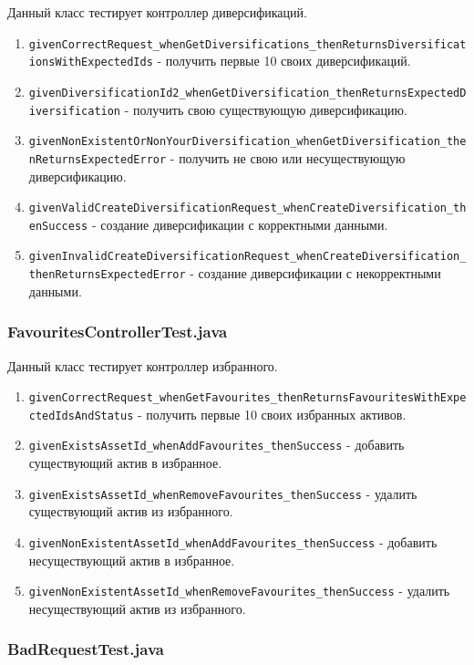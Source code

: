 \documentclass[a4paper, 14pt]{article}
\begin{document}
Данный класс тестирует контроллер диверсификаций.

\begin{enumerate}
    \item \texttt{givenCorrectRequest\_whenGetDiversifications\_thenReturnsDiversificationsWithExpectedIds} - получить первые 10 своих диверсификаций.
    \item \texttt{givenDiversificationId2\_whenGetDiversification\_thenReturnsExpectedDiversification} - получить свою существующую диверсификацию.
    \item \texttt{givenNonExistentOrNonYourDiversification\_whenGetDiversification\_thenReturnsExpectedError} - получить не свою или несуществующую диверсификацию.
    \item \texttt{givenValidCreateDiversificationRequest\_whenCreateDiversification\_thenSuccess} - создание диверсификации с корректными данными.
    \item \texttt{givenInvalidCreateDiversificationRequest\_whenCreateDiversification\_thenReturnsExpectedError} - создание диверсификации с некорректными данными.
\end{enumerate}

\subsubsection{FavouritesControllerTest.java}

Данный класс тестирует контроллер избранного.

\begin{enumerate}
    \item \texttt{givenCorrectRequest\_whenGetFavourites\_thenReturnsFavouritesWithExpectedIdsAndStatus} - получить первые 10 своих избранных активов.
    \item \texttt{givenExistsAssetId\_whenAddFavourites\_thenSuccess} - добавить существующий актив в избранное.
    \item \texttt{givenExistsAssetId\_whenRemoveFavourites\_thenSuccess} - удалить существующий актив из избранного.
    \item \texttt{givenNonExistentAssetId\_whenAddFavourites\_thenSuccess} - добавить несуществующий актив в избранное.
    \item \texttt{givenNonExistentAssetId\_whenRemoveFavourites\_thenSuccess} - удалить несуществующий актив из избранного.
\end{enumerate}

\subsubsection{BadRequestTest.java}
\end{document}
